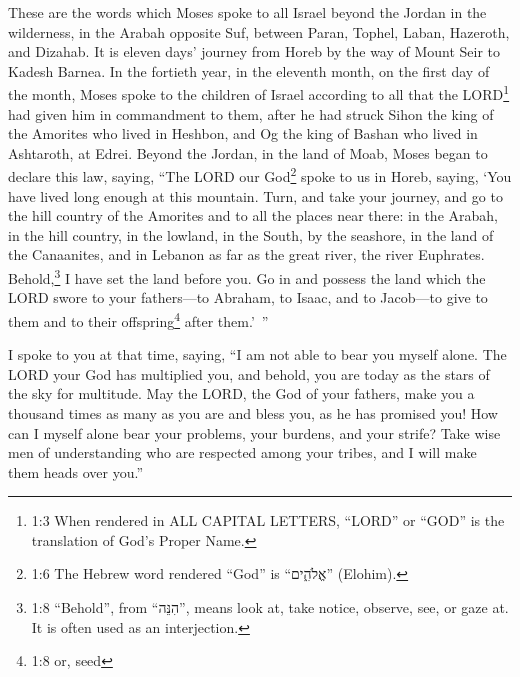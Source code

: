 




\vspace{-1.36in}


\mychapter{} \myverse*{}These are the words which Moses spoke to all Israel beyond the
Jordan in the wilderness, in the Arabah opposite Suf, between Paran, Tophel, Laban, Hazeroth, and Dizahab.
\myverse{}It is eleven days’ journey from Horeb by the way of Mount Seir to Kadesh Barnea.
\myverse{}In the fortieth year, in the eleventh month, on the first day of the month,
Moses spoke to the children of Israel according to all that the LORD\footnote{1:3 When rendered in ALL CAPITAL LETTERS, “LORD” or “GOD” is the translation of God’s Proper Name.}
had given him in commandment to them,
\myverse{}after he had struck Sihon the king of the Amorites who lived in Heshbon, and
Og the king of Bashan who lived in Ashtaroth, at Edrei.
\myverse{}Beyond the Jordan, in the land of Moab, Moses began to declare this law, saying,
\myverse{}“The LORD our God\footnote{1:6 The Hebrew word rendered “God” is “אֱלֹהִ֑ים” (Elohim).} spoke to us in Horeb,
saying, ‘You have lived long enough at this mountain.
\myverse{}Turn, and take your journey, and go to the hill country of the Amorites and
to all the places near there: in the Arabah, in the hill country, in the lowland, in the South, by the
seashore, in the land of the Canaanites, and in Lebanon as far as the great river, the river Euphrates.
\myverse{}Behold,\footnote{1:8 “Behold”, from “הִנֵּה”, means look at, take notice, observe, see, or gaze at. It is
	often used as an interjection.} I have set the land before you. Go in and possess the land which
the LORD swore to your fathers—to Abraham, to Isaac, and to Jacob—to give to them and to their offspring\footnote{1:8 or, seed} after them.’ ”


\myverse{}I spoke to you at that time, saying, “I am not able to bear you
myself alone.
\myverse{}The LORD your God has multiplied you, and behold, you are today as the stars
of the sky for multitude.
\myverse{}May the LORD, the God of your fathers, make you a thousand times as many as
you are and bless you, as he has promised you!
\myverse{}How can I myself alone bear your problems, your burdens, and your strife?
\myverse{}Take wise men of understanding who are respected among your tribes, and I
will make them heads over you.”


